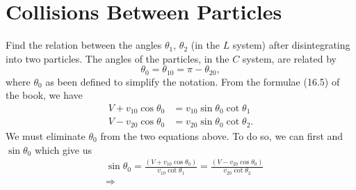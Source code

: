 \chapter{Collisions Between Particles}


\begin{problem}
{
Find the relation between the angles $\theta_1$, $\theta_2$ (in the $L$ system) after disintegrating into two particles.
}
{
The angles of the particles, in the $C$ system, are related by
\begin{equation*}
\theta_0 = \theta_{10} = \pi - \theta_{20},
\end{equation*}
where $\theta_0$ as been defined to simplify the notation. From the formulae (16.5) of the book, we have
\begin{align*}
    V + v_{10}\cos{\theta_0} &= v_{10} \sin{\theta_0} \cot{\theta_1} \\
    V - v_{20}\cos{\theta_0} &= v_{20} \sin{\theta_0} \cot{\theta_2} .
\end{align*}
We must eliminate $\theta_0$ from the two equations above. To do so, we can first and $\sin{\theta_0}$ which give us
\begin{align*}
    &\sin{\theta_0} = \frac{\left( V + v_{10}\cos{\theta_0} \right)}{v_{10}\cot{\theta_1}} = \frac{\left( V - v_{20}\cos{\theta_0} \right)}{v_{20}\cot{\theta_2}} \\
    &\Rightarrow 
\end{align*}
}
{
}
\end{problem}